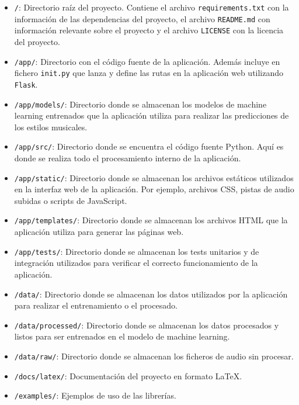 \begin{itemize}
\tightlist

\item \texttt{/}: Directorio raíz del proyecto. Contiene el archivo \texttt{requirements.txt} con la información de las dependencias del proyecto, el archivo \texttt{README.md} con información relevante sobre el proyecto y el archivo \texttt{LICENSE} con la licencia del proyecto.

\item \texttt{/app/}: Directorio con el código fuente de la aplicación. Además incluye en fichero \texttt{\textunderscore\textunderscore init\textunderscore\textunderscore .py} que lanza y define las rutas en la aplicación web utilizando \texttt{Flask}.

\item \texttt{/app/models/}: Directorio donde se almacenan los modelos de machine learning entrenados que la aplicación utiliza para realizar las predicciones de los estilos musicales.

\item \texttt{/app/src/}: Directorio donde se encuentra el código fuente Python. Aquí es donde se realiza todo el procesamiento interno de la aplicación.

\item \texttt{/app/static/}: Directorio donde se almacenan los archivos estáticos utilizados en la interfaz web de la aplicación. Por ejemplo, archivos CSS, pistas de audio subidas o scripts de JavaScript.

\item \texttt{/app/templates/}: Directorio donde se almacenan los archivos HTML que la aplicación utiliza para generar las páginas web.

\item \texttt{/app/tests/}: Directorio donde se almacenan los tests unitarios y de integración utilizados para verificar el correcto funcionamiento de la aplicación.

\item \texttt{/data/}: Directorio donde se almacenan los datos utilizados por la aplicación para realizar el entrenamiento o el procesado.

\item \texttt{/data/processed/}: Directorio donde se almacenan los datos procesados y listos para ser entrenados en el modelo de machine learning.

\item \texttt{/data/raw/}: Directorio donde se almacenan los ficheros de audio sin procesar.

\item \texttt{/docs/latex/}: Documentación del proyecto en formato \LaTeX.

\item \texttt{/examples/}: Ejemplos de uso de las librerías.

\end{itemize}

